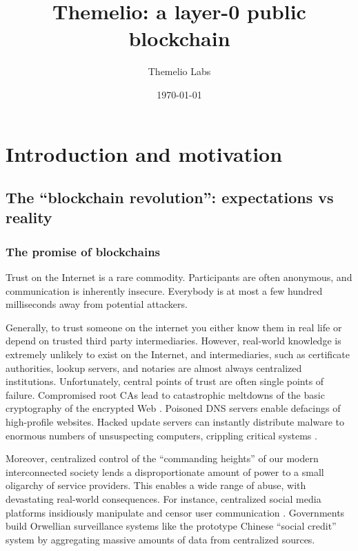 \documentclass[headinclude]{scrbook}
\begin{document}
\title{Themelio: a layer-0 public blockchain}
\author{Themelio Labs}
\date{\today}
\maketitle



\tableofcontents


\chapter{Introduction and motivation}

\section{The ``blockchain revolution'': expectations vs reality}

\subsection{The promise of blockchains}

Trust on the Internet is a rare commodity. Participants are often anonymous, and communication is inherently insecure. Everybody is at most a few hundred milliseconds away from potential attackers.

Generally, to trust someone on the internet you either know them in real life or depend on trusted third party intermediaries. However, real-world knowledge is extremely unlikely to exist on the Internet, and intermediaries, such as certificate authorities, lookup servers, and notaries are almost always centralized institutions. Unfortunately, central points of trust are often single points of failure. Compromised root CAs lead to catastrophic meltdowns of the basic cryptography of the encrypted Web \cite{prins2011diginotar}. Poisoned DNS servers enable defacings of high-profile websites. Hacked update servers can instantly distribute malware to enormous numbers of unsuspecting computers, crippling critical systems \cite{richardson2017ransomware}.

Moreover, centralized control of the ``commanding heights'' of our modern interconnected society lends a disproportionate amount of power to a small oligarchy of service providers. This enables a wide range of abuse, with devastating real-world consequences. For instance, centralized social media platforms insidiously manipulate and censor user communication \cite{sunstein2018republic}. Governments build Orwellian surveillance systems like the prototype Chinese ``social credit'' system \cite{wang11china} by aggregating massive amounts of data from centralized sources.
\end{document}

